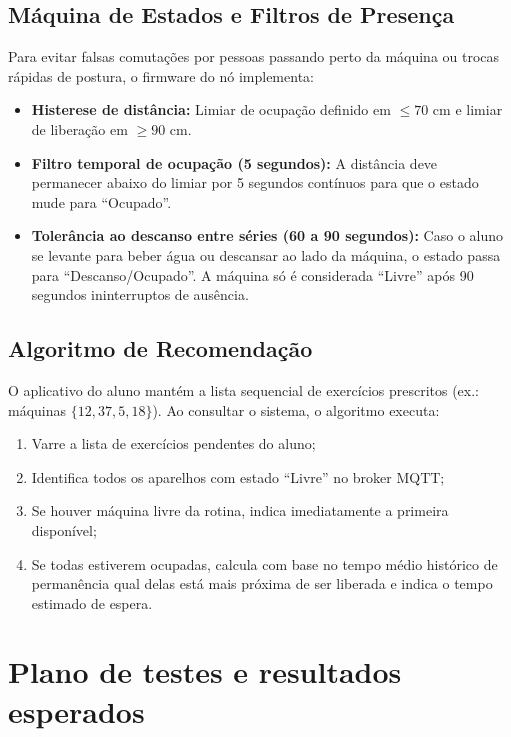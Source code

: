 \documentclass[11pt,a4paper]{article}
\begin{document}
\subsection{Máquina de Estados e Filtros de Presença}
Para evitar falsas comutações por pessoas passando perto da máquina ou trocas rápidas de
postura, o firmware do nó implementa:
\begin{itemize}
  \item \textbf{Histerese de distância:} Limiar de ocupação definido em $\le 70\text{ cm}$ e
        limiar de liberação em $\ge 90\text{ cm}$.
  \item \textbf{Filtro temporal de ocupação (5 segundos):} A distância deve permanecer abaixo
        do limiar por 5 segundos contínuos para que o estado mude para ``Ocupado''.
  \item \textbf{Tolerância ao descanso entre séries (60 a 90 segundos):} Caso o aluno se
        levante para beber água ou descansar ao lado da máquina, o estado passa para
        ``Descanso/Ocupado''. A máquina só é considerada ``Livre'' após 90 segundos
        ininterruptos de ausência.
\end{itemize}

\subsection{Algoritmo de Recomendação}
O aplicativo do aluno mantém a lista sequencial de exercícios prescritos (ex.: máquinas
$\{12, 37, 5, 18\}$). Ao consultar o sistema, o algoritmo executa:
\begin{enumerate}
  \item Varre a lista de exercícios pendentes do aluno;
  \item Identifica todos os aparelhos com estado ``Livre'' no broker MQTT;
  \item Se houver máquina livre da rotina, indica imediatamente a primeira disponível;
  \item Se todas estiverem ocupadas, calcula com base no tempo médio histórico de permanência
        qual delas está mais próxima de ser liberada e indica o tempo estimado de espera.
\end{enumerate}

\section{Plano de testes e resultados esperados}
\end{document}
